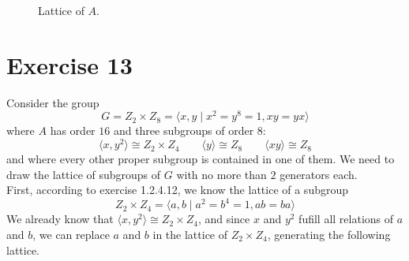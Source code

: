 \documentclass[12pt]{article}
\begin{document}
    \begin{figure}[H]
        \centering

        \caption{\label{fig:figure1} Lattice of $A.$}
    \end{figure} 


    \section*{Exercise 13}
    Consider the group 
    \[G = Z_2 \times Z_8 = \langle x, y \mid x^2 = y^8 = 1, xy = yx \rangle\]
    where $A$ has order $16$ and three subgroups of order $8$:
    \[\langle x, y^2 \rangle \cong Z_2 \times Z_4 
    \qquad \langle y \rangle \cong Z_8
    \qquad \langle xy \rangle \cong Z_8 \]
    and where every other proper subgroup is contained in one of them.
    We need to draw the lattice of subgroups of $G$
    with no more than $2$ generators each. \\
    First, according to exercise 1.2.4.12,
    we know the lattice of a subgroup
    \[ Z_2 \times Z_4 = \langle a, b \mid a^2 = b^4 = 1, ab = ba \rangle \]
    We already know that $\langle x, y^2 \rangle \cong Z_2 \times Z_4$,
    and since $x$ and $y^2$ fufill all relations of $a$ and $b$,
    we can replace $a$ and $b$
    in the lattice of $Z_2 \times Z_4$,
    generating the following lattice.
    
\end{document}
